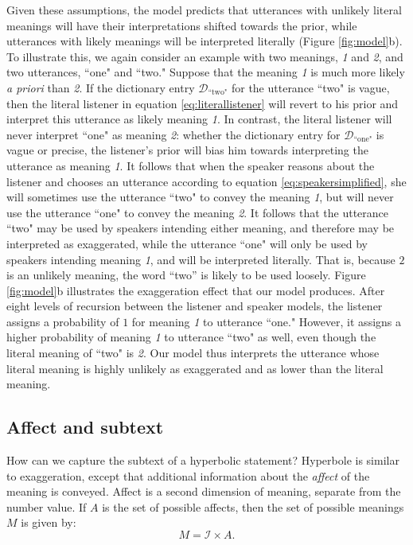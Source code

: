 \documentclass{article} %
\newcommand{\dictionary}{\ensuremath{\mathcal{D}}\xspace}
\begin{document}
Given these assumptions, the model predicts that utterances with unlikely literal meanings will have their interpretations shifted towards the prior, while utterances with likely meanings will be interpreted literally (Figure \ref{fig:model}b). To illustrate this, we again consider an example with two meanings, \emph{1} and \emph{2}, and two utterances, ``one" and ``two." Suppose that the meaning \emph{1} is much more likely \emph{a priori} than \emph{2}. If the dictionary entry $\dictionary_{\text{``two"}}$ for the utterance ``two" is vague, then the literal listener in equation \ref{eq:literallistener} will revert to his prior and interpret this utterance as likely meaning \emph{1}. In contrast, the literal listener will never interpret ``one" as meaning \emph{2}: whether the dictionary entry for $\dictionary_{\text{``one"}}$ is vague or precise, the listener's prior will bias him towards interpreting the utterance as meaning \emph{1}. It follows that when the speaker reasons about the listener and chooses an utterance according to equation \ref{eq:speakersimplified}, she will sometimes use the utterance ``two" to convey the meaning \emph{1}, but will never use the utterance ``one" to convey the meaning \emph{2}. It follows that the utterance ``two" may be used by speakers intending either meaning, and therefore may be interpreted as exaggerated, while the utterance ``one" will only be used by speakers intending meaning \emph{1}, and will be interpreted literally. That is, because $2$ is an unlikely meaning, the word ``two'' is likely to be used loosely. Figure \ref{fig:model}b illustrates the exaggeration effect that our model produces. After eight levels of recursion between the listener and speaker models, the listener assigns a probability of $1$ for meaning \emph{1} to utterance ``one." However, it assigns a higher probability of meaning \emph{1} to utterance ``two" as well, even though the literal meaning of ``two" is \emph{2}. Our model thus interprets the utterance whose literal meaning is highly unlikely as exaggerated and as lower than the literal meaning.

\subsection{Affect and subtext}

How can we capture the subtext of a hyperbolic statement? Hyperbole is similar to exaggeration, except that additional information about the \emph{affect} of the meaning is conveyed. Affect is a second dimension of meaning, separate from the number value. If $A$ is the set of possible affects, then the set of possible meanings $M$ is given by:
\begin{equation}
M = {\mathcal I} \times A.
\end{equation}
\end{document}
